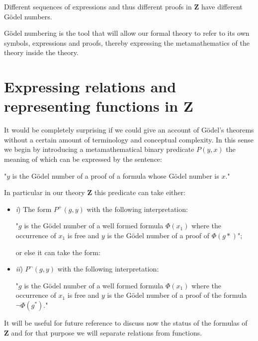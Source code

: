 \documentclass[12pt]{article}
\begin{document}
Different sequences of expressions and thus different proofs in $\textbf{Z}$ have different G\"{o}del numbers.

G\"{o}del numbering  is the tool that will allow our formal theory to refer to its own symbols, expressions and proofs, thereby expressing the metamathematics of the theory inside the theory.

\section{Expressing relations and representing functions in \textbf{Z}}\normalsize

It would be completely surprising if we could give an account of G\"{o}del's theorems without a certain amount of terminology and conceptual complexity. In this sense we begin by introducing a metamathematical binary predicate $P (y, x)$ the meaning of which can be expressed by the sentence:

\begin{center}
"$y$ is the G\"{o}del number of a proof of a formula whose G\"{o}del number is $x$."
\end{center}

In particular in our theory $\textbf{Z}$ this predicate can take either:

\begin{itemize}

\item \emph{i}) The form $P^{+} (g, y)$ with the following interpretation:

\begin{center}
"$g$ is the G\"{o}del number of a well formed formula $\Phi (x_1)$ where the occurrence of $x_1$ is free and $y$ is the G\"{o}del number of a proof of $\Phi (g*)$";
\end{center}
 
or else it can take the form:
\item \emph{ii}) $P^{\neg} (g, y)$ with the following interpretation:

\begin{center}
"$g$ is the G\"{o}del number of a well formed formula $\Phi (x_1)$ where the occurrence of $x_1$ is free and $y$ is the G\"{o}del number of a proof of the formula $\neg \Phi (g^*)$."
\end{center}
\end{itemize}

It will be useful for future reference to discuss now the status of the formulas of $\textbf{Z}$ and for that purpose we will separate relations from functions.
\end{document}
